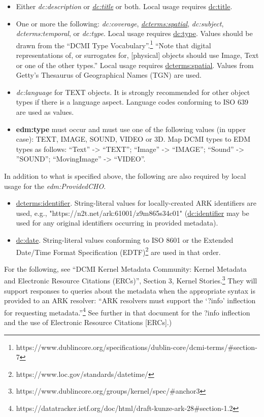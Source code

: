 \documentclass[11pt]{article}
\begin{document}
\begin{itemize}

  \item Either \textit{dc:description} or \underline{\textit{dc:title}} or both. Local usage requires \underline{dc:title}.

  \item One or more the following: \textit{dc:coverage}, \underline{\textit{dcterms:spatial}}, \textit{dc:subject}, \textit{dcterms:temporal}, or \textit{dc:type}. Local usage requires \underline{dc:type}. Values should be drawn from the ``DCMI Type Vocabulary''.\footnote{https://www.dublincore.org/specifications/dublin-core/dcmi-terms/\#section-7} ``Note that digital representations of, or surrogates for, [physical] objects should use Image, Text or one of the other types.'' Local usage requires \underline{dcterms:spatial}. Values from Getty's Thesaurus of Geographical Names (TGN) are used.

  \item \textit{dc:language} for TEXT objects. It is strongly recommended for other object types if there is a language aspect. Language codes conforming to ISO 639 are used as values.

  \item \textbf{edm:type} must occur and must use one of the following values (in upper case): TEXT, IMAGE, SOUND, VIDEO or 3D. Map DCMI types to EDM types as follows: ``Text'' -> ``TEXT''; ``Image'' -> ``IMAGE''; ``Sound'' -> ''SOUND''; ``MovingImage'' -> ``VIDEO''. 
\end{itemize}

In addition to what is specified above, the following are also required by local usage for the \textit{edm:ProvidedCHO}.
\begin{itemize}
  \item \underline{dcterms:identifier}. String-literal values for locally-created ARK identifiers are used, e.g., "https://n2t.net/ark:61001/z9m865s34c01" (\underline{dc:identifier} may be used for any original identifiers occurring in provided metadata).

  \item \underline{dc:date}. String-literal values conforming to ISO 8601 or the Extended Date/Time Format Specification (EDTF)\footnote{https://www.loc.gov/standards/datetime/} are used in that order.

\end{itemize}

For the following, see ``DCMI Kernel Metadata Community: Kernel Metadata and Electronic Resource Citations (ERCs)'', Section 3, Kernel Stories.\footnote{https://www.dublincore.org/groups/kernel/spec/\#anchor3} They will support responses to queries about the metadata when the appropriate syntax is provided to an ARK resolver: ``ARK resolvers must support the `?info' inflection for requesting metadata.''\footnote{https://datatracker.ietf.org/doc/html/draft-kunze-ark-28\#section-1.2} See further in that document for the ?info inflection and the use of Electronic Resource Citations [ERCs].)
\end{document}
